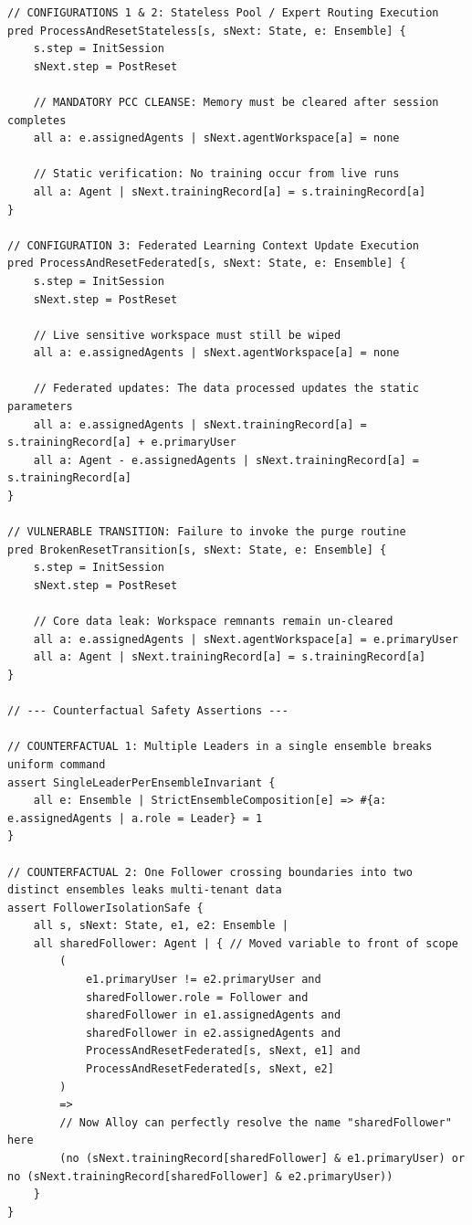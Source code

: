 \begin{lstlisting}[language=Alloy, caption={Complete Multi-Agent \& Isolation Architecture Verification Script}]
// CONFIGURATIONS 1 & 2: Stateless Pool / Expert Routing Execution
pred ProcessAndResetStateless[s, sNext: State, e: Ensemble] {
    s.step = InitSession
    sNext.step = PostReset
    
    // MANDATORY PCC CLEANSE: Memory must be cleared after session completes
    all a: e.assignedAgents | sNext.agentWorkspace[a] = none 
    
    // Static verification: No training occur from live runs
    all a: Agent | sNext.trainingRecord[a] = s.trainingRecord[a]
}

// CONFIGURATION 3: Federated Learning Context Update Execution
pred ProcessAndResetFederated[s, sNext: State, e: Ensemble] {
    s.step = InitSession
    sNext.step = PostReset
    
    // Live sensitive workspace must still be wiped
    all a: e.assignedAgents | sNext.agentWorkspace[a] = none
    
    // Federated updates: The data processed updates the static parameters
    all a: e.assignedAgents | sNext.trainingRecord[a] = s.trainingRecord[a] + e.primaryUser
    all a: Agent - e.assignedAgents | sNext.trainingRecord[a] = s.trainingRecord[a]
}

// VULNERABLE TRANSITION: Failure to invoke the purge routine
pred BrokenResetTransition[s, sNext: State, e: Ensemble] {
    s.step = InitSession
    sNext.step = PostReset
    
    // Core data leak: Workspace remnants remain un-cleared
    all a: e.assignedAgents | sNext.agentWorkspace[a] = e.primaryUser
    all a: Agent | sNext.trainingRecord[a] = s.trainingRecord[a]
}

// --- Counterfactual Safety Assertions ---

// COUNTERFACTUAL 1: Multiple Leaders in a single ensemble breaks uniform command
assert SingleLeaderPerEnsembleInvariant {
    all e: Ensemble | StrictEnsembleComposition[e] => #{a: e.assignedAgents | a.role = Leader} = 1
}

// COUNTERFACTUAL 2: One Follower crossing boundaries into two distinct ensembles leaks multi-tenant data
assert FollowerIsolationSafe {
    all s, sNext: State, e1, e2: Ensemble | 
    all sharedFollower: Agent | { // Moved variable to front of scope
        (
            e1.primaryUser != e2.primaryUser and
            sharedFollower.role = Follower and
            sharedFollower in e1.assignedAgents and
            sharedFollower in e2.assignedAgents and
            ProcessAndResetFederated[s, sNext, e1] and
            ProcessAndResetFederated[s, sNext, e2]
        )
        => 
        // Now Alloy can perfectly resolve the name "sharedFollower" here
        (no (sNext.trainingRecord[sharedFollower] & e1.primaryUser) or no (sNext.trainingRecord[sharedFollower] & e2.primaryUser))
    }
}



\end{lstlisting}
